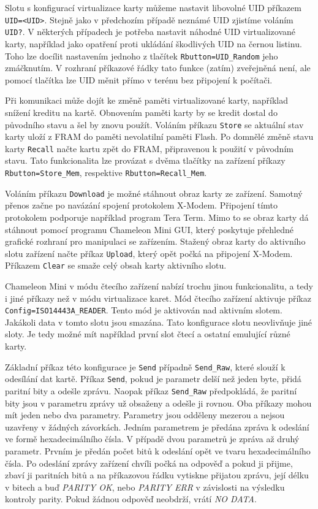 Slotu s konfigurací virtualizace karty můžeme nastavit libovolné UID příkazem \verb|UID=<UID>|. Stejně jako v předchozím případě neznámé UID zjistíme voláním \verb|UID?|. V některých případech je potřeba nastavit náhodné UID virtualizované karty, například jako opatření proti ukládání škodlivých UID na černou listinu. Toho lze docílit nastavením jednoho z tlačítek \verb|Rbutton=UID_Random| jeho zmáčknutím. V rozhraní příkazové řádky tato funkce (zatím) zveřejněná není, ale pomocí tlačítka lze UID měnit přímo v terénu bez připojení k počítači.\par
Při komunikaci může dojít ke změně paměti virtualizované karty, například snížení kreditu na kartě. Obnovením paměti karty by se kredit dostal do původního stavu a šel by znovu použít. Voláním příkazu \verb|Store| se aktuální stav karty uloží z FRAM do paměti nevolatilní paměti Flash. Po domnělé změně stavu karty \verb|Recall| načte kartu zpět do FRAM, připravenou k použití v původním stavu. Tato funkcionalita lze provázat s dvěma tlačítky na zařízení příkazy \verb|Rbutton=Store_Mem|, respektive \verb|Rbutton=Recall_Mem|.\par
Voláním příkazu \verb|Download| je možné stáhnout obraz karty ze zařízení. Samotný přenos začne po navázání spojení protokolem {X-Modem}. Připojení tímto protokolem podporuje například program Tera Term. Mimo to se obraz karty dá stáhnout pomocí programu Chameleon Mini GUI\footnotemark, který poskytuje přehledné grafické rozhraní pro manipulaci se zařízením. Stažený obraz karty do aktivního slotu zařízení načte příkaz \verb|Upload|, který opět počká na připojení {X-Modem}. Příkazem \verb|Clear| se smaže celý obsah karty aktivního slotu.\par
{}
Chameleon Mini v módu čtecího zařízení nabízí trochu jinou funkcionalitu, a tedy i jiné příkazy než v módu virtualizace karet. Mód čtecího zařízení aktivuje příkaz \\\verb|Config=ISO14443A_READER|. Tento mód je aktivován nad aktivním slotem. Jakákoli data v tomto slotu jsou smazána. Tato konfigurace slotu neovlivňuje jiné sloty. Je tedy možné mít například první slot čtecí a ostatní emulující různé karty. \par
Základní příkaz této konfigurace je \verb|Send| případně \verb|Send_Raw|, které slouží k odesílání dat kartě. Příkaz \verb|Send|, pokud je parametr delší než jeden byte, přidá paritní bity a odešle zprávu. Naopak příkaz \verb|Send_Raw| předpokládá, že paritní bity jsou v parametru zprávy už obsaženy a odešle ji rovnou. Oba příkazy mohou mít jeden nebo dva parametry. Parametry jsou odděleny mezerou a nejsou uzavřeny v žádných závorkách. Jedním parametrem je předána zpráva k odeslání ve formě hexadecimálního čísla. V případě dvou parametrů je zpráva až druhý parametr. Prvním je předán počet bitů k odeslání opět ve tvaru hexadecimálního čísla. Po odeslání zprávy zařízení chvíli počká na odpověď a pokud ji přijme, zbaví ji paritních bitů a na příkazovou řádku vytiskne přijatou zprávu, její délku v bitech a buď \emph{PARITY OK}, nebo \emph{PARITY ERR} v závislosti na výsledku kontroly parity. Pokud žádnou odpověď neobdrží, vrátí \emph{NO DATA}.\par
